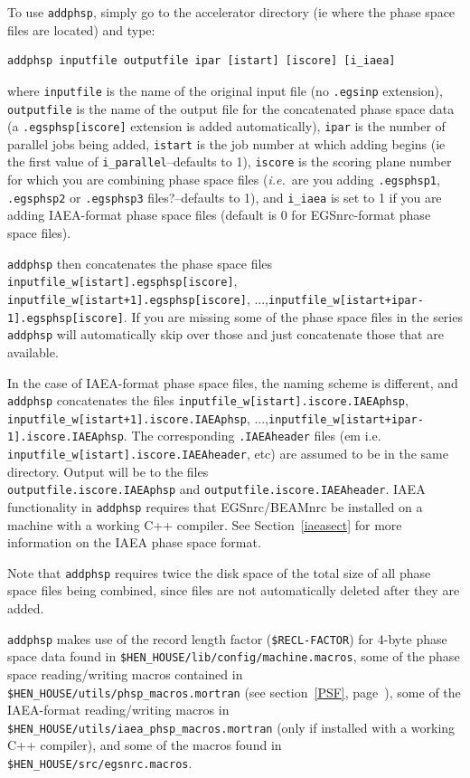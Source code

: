 \documentclass[12pt,twoside]{article}
\newcommand{\ie}{{\em i.e.}}
\begin{document}
To use {\tt addphsp},
simply go to the accelerator directory (ie where the phase space files
are located) and type:
\begin{verbatim}
addphsp inputfile outputfile ipar [istart] [iscore] [i_iaea]
\end{verbatim}
where {\tt inputfile} is the name of the original input file
(no {\tt .egsinp} extension), {\tt outputfile} is the name of the output file
for the concatenated phase space data (a {\tt .egsphsp[iscore]} extension
is added automatically), {\tt ipar} is the number of parallel jobs being
added, {\tt istart} is the job number at which adding begins
(ie the first value of {\tt i\_parallel}--defaults to 1),
{\tt iscore} is the scoring plane number
for which you are combining phase space files (\ie\ are
you adding {\tt .egsphsp1}, {\tt .egsphsp2} or {\tt .egsphsp3} files?--defaults
to 1), and {\tt i\_iaea} is set to 1 if you are adding IAEA-format phase
space files (default is 0 for EGSnrc-format phase space files).

{\tt addphsp} then concatenates the phase space files
{\tt inputfile\_w[istart].egsphsp[iscore]},
{\tt inputfile\_w[istart+1].egsphsp[iscore]},
...,{\tt inputfile\_w[istart+ipar-1].egsphsp[iscore]}.  If you are missing some of the phase space files in the series
{\tt addphsp} will automatically skip over those and just concatenate those
that are available.

In the case
of IAEA-format phase space files, the naming scheme is different, and
{\tt addphsp} concatenates the files
{\tt inputfile\_w[istart].iscore.IAEAphsp},\\
{\tt inputfile\_w[istart+1].iscore.IAEAphsp},
...,{\tt inputfile\_w[istart+ipar-1].iscore.IAEAphsp}.
The corresponding {\tt .IAEAheader} files
({em i.e.} {\tt inputfile\_w[istart].iscore.IAEAheader}, etc)
are assumed to be in the
same directory.  Output will be to the files\\
{\tt outputfile.iscore.IAEAphsp} and {\tt outputfile.iscore.IAEAheader}.
IAEA functionality in {\tt addphsp} requires that EGSnrc/BEAMnrc be
installed on a machine with a working C++ compiler.  See
Section~\ref{iaeasect} for more information on the IAEA phase space format.

Note that {\tt addphsp} requires twice the disk space of the total size of
all phase space files being combined, since files are not automatically
deleted after they are added.

{\tt addphsp} makes use of the record length factor ({\tt \$RECL-FACTOR}) for
4-byte phase space data found in {\tt \$HEN\_HOUSE/lib/config/machine.macros},
some of the phase space reading/writing
macros contained in {\tt \$HEN\_HOUSE/utils/phsp\_macros.mortran}
(see section~\ref{PSF}, page~\pageref{PSF}), some of
the IAEA-format reading/writing macros in \\
{\tt \$HEN\_HOUSE/utils/iaea\_phsp\_macros.mortran}
(only if installed with a working C++ compiler), and
some of the macros
found in  {\tt \$HEN\_HOUSE/src/egsnrc.macros}.
\end{document}

